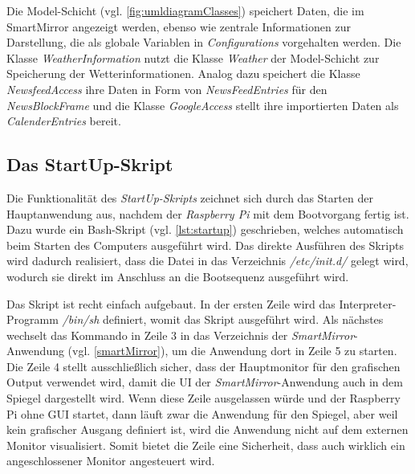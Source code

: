  Die Model-Schicht (vgl. \autoref{fig:umldiagramClasses}) speichert Daten, die im SmartMirror angezeigt werden, ebenso wie zentrale Informationen zur Darstellung, die als globale Variablen in \textit{Configurations} vorgehalten werden. Die Klasse \textit{WeatherInformation} nutzt die Klasse \textit{Weather} der Model-Schicht zur Speicherung der Wetterinformationen. 
 Analog dazu speichert die Klasse \textit{NewsfeedAccess} ihre Daten in Form von \textit{NewsFeedEntries} für den \textit{NewsBlockFrame} und die Klasse \textit{GoogleAccess} stellt ihre importierten Daten  als \textit{CalenderEntries} bereit.
 

\subsection{Das StartUp-Skript}
\label{subsec:startup}
Die Funktionalität des \textit{StartUp-Skripts} zeichnet sich durch das Starten der Hauptanwendung aus, nachdem der \textit{Raspberry Pi} mit dem Bootvorgang fertig ist. Dazu wurde ein Bash-Skript (vgl. \autoref{lst:startup}) geschrieben, welches automatisch beim Starten des Computers ausgeführt wird. 
Das direkte Ausführen des Skripts wird dadurch realisiert, dass die Datei in das Verzeichnis \textit{/etc/init.d/} gelegt wird, wodurch sie direkt im Anschluss an die Bootsequenz ausgeführt wird. \cite{nemeth2006linux}

\begin{minipage}{\textwidth}
	
\end{minipage} 

Das Skript ist recht einfach aufgebaut. In der ersten Zeile wird das Interpreter-Programm \textit{/bin/sh} definiert, womit das Skript ausgeführt wird. Als nächstes wechselt das Kommando in Zeile 3 in das Verzeichnis der \textit{SmartMirror}-Anwendung (vgl. \autoref{smartMirror}), um die Anwendung dort in Zeile 5 zu starten. Die Zeile 4 stellt ausschließlich sicher, dass der Hauptmonitor für den grafischen Output verwendet wird, damit die UI der \textit{SmartMirror}-Anwendung auch in dem Spiegel dargestellt wird. Wenn diese Zeile ausgelassen würde und der Raspberry Pi ohne GUI startet, dann läuft zwar die Anwendung für den Spiegel, aber weil kein grafischer Ausgang definiert ist, wird die Anwendung nicht auf dem externen Monitor visualisiert. Somit bietet die Zeile eine Sicherheit, dass auch wirklich ein angeschlossener Monitor angesteuert wird.

